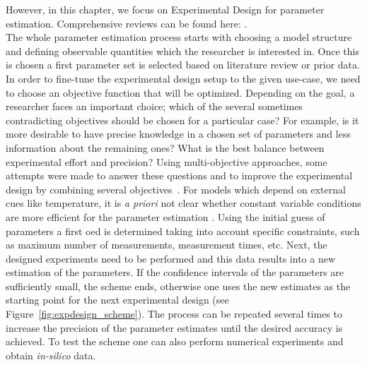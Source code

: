 \documentclass[10pt,A4paper]{article}
\begin{document}
However, in this chapter, we focus on Experimental Design for parameter estimation.
Comprehensive reviews can be found here: \cite{atkinsonDevelopmentsDesignExperiments1982, franceschiniModelbasedDesignExperiments2008,sunParameterEstimation2011,vilasPredictiveFood2016}.\\\linebreak
The whole parameter estimation process starts with choosing a model structure and defining observable quantities which the researcher is interested in.
Once this is chosen a first parameter set is selected based on literature review or prior data.
In order to fine-tune the experimental design setup to the given use-case, we need to choose an objective function that will be optimized.
Depending on the goal, a researcher faces an important choice; which of the several sometimes contradicting objectives should be chosen for a particular case?
For example, is it more desirable to have precise knowledge in a chosen set of parameters and less information about the remaining ones?
What is the best balance between experimental effort and precision?
Using multi-objective approaches, some attempts were made to answer these questions and to improve the experimental design by combining several objectives~\cite{telenOptimalExperimentDesign2012, logistRobustMultiobjectiveOptimal2011}.
For models which depend on external cues like temperature, it is {\it a priori} not clear whether constant variable conditions are more efficient for the parameter estimation \cite{versyckIntroducingOptimal1999,garciaQualityShelflifePrediction2015}.
Using the initial guess of parameters a first \ac{oed} is determined taking into account specific constraints, such as maximum number of measurements, measurement times, etc.
Next, the designed experiments need to be performed and this data results into a new estimation of the parameters.
If the confidence intervals of the parameters are sufficiently small, the scheme ends, otherwise one uses the new estimates as the starting point for the next experimental design (see Figure~\ref{fig:expdesign_scheme}).
The process can be repeated several times to increase the precision of the parameter estimates until the desired accuracy is achieved.
To test the scheme one can also perform numerical experiments and obtain {\it in-silico} data.
\end{document}
